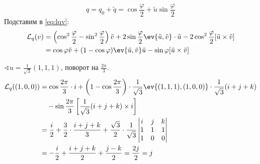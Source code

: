 \[q = q_0 + \tilde{q} = \cos \frac{\varphi}{2} + \tilde{u} \sin \frac{\varphi}{2}\]
Подставим в \eqref{eq:lqv}:
\begin{align*}
\mathcal{L}_q(v)
 & = \left(\cos^2 \frac{\varphi}{2} - \sin^2 \frac{\varphi}{2}\right) \tilde{v} + 2 \sin \frac{\varphi}{2} \ev{\tilde{u}, \tilde{v}}\cdot \tilde{u} - 2 \cos^2 \frac{\varphi}{2} [\tilde{u} \times \tilde{v}] \\
 & = \cos \varphi \tilde{v} + (1 - \cos\varphi) \ev{\tilde{u}, \tilde{v}} \tilde{u} - \sin\varphi [\tilde{u} \times \tilde{v}]
\end{align*}

\begin{example}
    \(\sphericalangle u = \frac{1}{\sqrt{3}}(1, 1, 1)\), поворот на \(\frac{2\pi}{3}\).
    \begin{align*}
        \mathcal{L}_q((1, 0, 0))
         &= \cos \frac{2\pi}{3} \cdot i + \left(1 - \cos \frac{2\pi}{3}\right)
          \cdot \frac{1}{\sqrt{3}} \ev{(1, 1, 1), (1, 0, 0)}
          \cdot \frac{1}{\sqrt{3}}(i+j+k) \\
          &\quad - \sin \frac{2\pi}{3} \left[\frac{1}{\sqrt{3}} (i + j + k) \times i\right] \\
          &= \frac{i}{2} + \frac{3}{2} \cdot \frac{i + j + k}{3} + \frac{\sqrt{3}}{2} \cdot \frac{1}{\sqrt{3}} \begin{vmatrix}
              i & j & k \\
              1 & 1 & 1 \\
              1 & 0 & 0
          \end{vmatrix} \\
          &= -\frac{i}{2} + \frac{i + j + k}{2} + \frac{j - k}{2} = \frac{2j}{2} = j
    \end{align*} 
\end{example}

